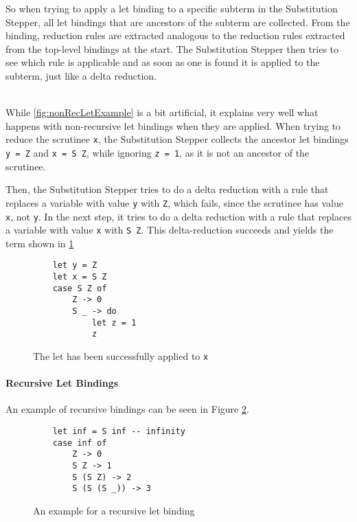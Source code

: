 So when trying to apply a let binding to a specific subterm in the Substitution Stepper,
all let bindings that are ancestors of the subterm are collected.
From the binding, reduction rules are extracted analogous to the reduction rules extracted from the top-level bindings at the start.
The Substitution Stepper then tries to see which rule is applicable
and as soon as one is found it is applied to the subterm, just like a delta reduction.

\ \\
While \ref*{fig:nonRecLetExample} is a bit artificial,
it explains very well what happens with non-recursive let bindings when they are applied.
When trying to reduce the scrutinee \texttt{x},
the Substitution Stepper collects the ancestor let bindings \texttt{y = Z} and \texttt{x = S Z},
while ignoring \texttt{z = 1}, as it is not an ancestor of the scrutinee.

Then, the Substitution Stepper tries to do a delta reduction with a rule that replaces a variable with value \texttt{y} with \texttt{Z},
which fails, since the scrutinee has value \texttt{x}, not \texttt{y}.
In the next step,
it tries to do a delta reduction with a rule that replaces a variable with value \texttt{x} with \texttt{S Z}.
This delta-reduction succeeds and yields the term shown in \ref*{fig:nonRecLetExampleResolved}

\begin{figure}[!ht]
\begin{verbatim}
    let y = Z
    let x = S Z
    case S Z of
        Z -> 0
        S _ -> do
            let z = 1
            z
\end{verbatim}
    \caption{The let has been successfully applied to \texttt{x}}
    \label{fig:nonRecLetExampleResolved}
\end{figure}

\paragraph*{Recursive Let Bindings}
An example of recursive bindings can be seen in Figure \ref*{fig:recLetExample}.

\begin{figure}[!ht]
\begin{verbatim}
    let inf = S inf -- infinity
    case inf of
        Z -> 0
        S Z -> 1
        S (S Z) -> 2
        S (S (S _)) -> 3
\end{verbatim}
    \caption{An example for a recursive let binding}
    \label{fig:recLetExample}
\end{figure}

